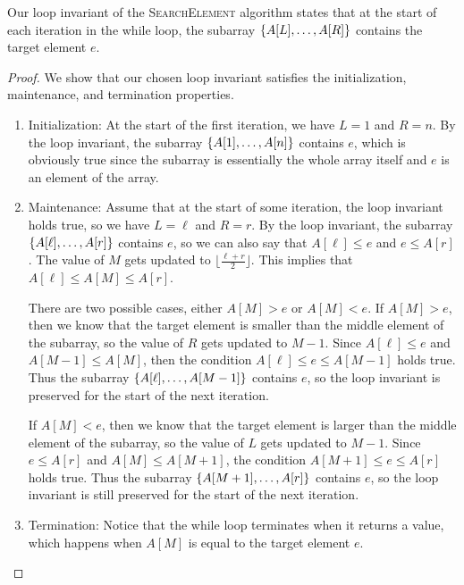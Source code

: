 \begin{example}
    Our loop invariant of the \textsc{SearchElement} algorithm states that at the start of each iteration in the while loop, the subarray $\left\{A[L],\ldots,A[R]\right\}$ contains the target element $e$.

    \begin{proof}
        We show that our chosen loop invariant satisfies the initialization, maintenance, and termination properties.

        \begin{enumerate}
            \item Initialization: At the start of the first iteration, we have $L=1$ and $R=n$. By the loop invariant, the subarray $\left\{A[1],\ldots,A[n]\right\}$ contains $e$, which is obviously true since the subarray is essentially the whole array itself and $e$ is an element of the array.
            \item Maintenance: Assume that at the start of some iteration, the loop invariant holds true, so we have $L=\ell$ and $R = r$. By the loop invariant, the subarray $\left\{A[\ell],\ldots,A[r]\right\}$ contains $e$, so we can also say that $A[\ell] \le e$ and $e \le A[r]$. The value of $M$ gets updated to $\lfloor\frac{\ell+r}{2}\rfloor$. This implies that $A[\ell] \le A[M] \le A[r]$. 
                
                There are two possible cases, either $A[M] > e$ or $A[M] < e$. If $A[M] > e$, then we know that the target element is smaller than the middle element of the subarray, so the value of $R$ gets updated to $M-1$. Since $A[\ell] \le e$ and $A[M-1] \le A[M]$, then the condition $A[\ell] \le e \le A[M-1]$ holds true. Thus the subarray $\left\{A[\ell],\ldots,A[M-1]\right\}$ contains $e$, so the loop invariant is preserved for the start of the next iteration.

                If $A[M] < e$, then we know that the target element is larger than the middle element of the subarray, so the value of $L$ gets updated to $M-1$. Since $e \le A[r]$ and $A[M] \le A[M+1]$, the condition $A[M+1] \le e \le A[r]$ holds true. Thus the subarray $\left\{A[M+1],\ldots,A[r]\right\}$ contains $e$, so the loop invariant is still preserved for the start of the next iteration.

            \item Termination: Notice that the while loop terminates when it returns a value, which happens when $A[M]$ is equal to the target element $e$. 


\end{enumerate}
\end{proof}
\end{example}
